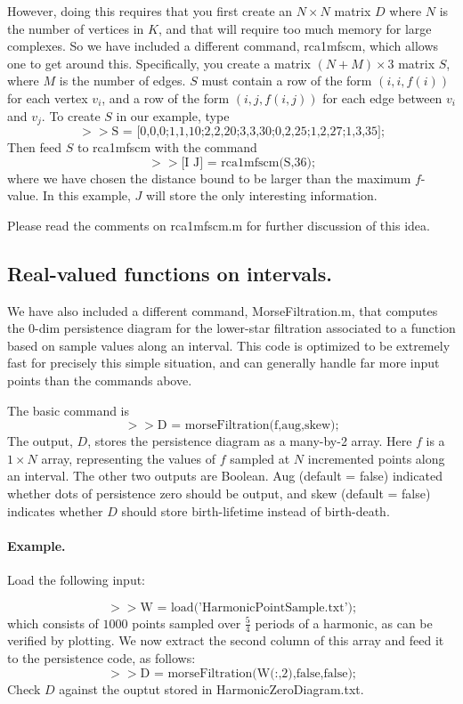 \documentclass[a4paper,10pt]{article}
\begin{document}
However, doing this requires that you first create an $N \times N$ matrix $D$ where $N$ is the number of vertices in $K$, and
that will require too much memory for large complexes.
So we have included a different command, rca1mfscm, which allows one to get around this.
Specifically, you create a matrix $(N + M) \times 3$ matrix $S$, where $M$ is the number of edges.
$S$ must contain a row of the form $(i,i,f(i))$ for each vertex $v_i$, and a row of the form
$(i,j, f(i,j))$ for each edge between $v_i$ and $v_j$.
To create $S$ in our example, type
$$ >> \mbox{S = [0,0,0;1,1,10;2,2,20;3,3,30;0,2,25;1,2,27;1,3,35];}$$
Then feed $S$ to rca1mfscm with the command
$$ >> \mbox{[I J] = rca1mfscm(S,36);}$$
where we have chosen the distance bound to be larger than the maximum $f$-value.
In this example, $J$ will store the only interesting information.

Please read the comments on rca1mfscm.m for further discussion of this idea.

\subsection{Real-valued functions on intervals.}

We have also included a different command, MorseFiltration.m, that computes the 0-dim persistence diagram for the lower-star filtration
associated to a function based on sample values along an interval.
This code is optimized to be extremely fast for precisely this simple situation, and can generally handle far more input points than the commands above.

The basic command is
$$ >> \mbox{D = morseFiltration(f,aug,skew);}$$
The output, $D$, stores the persistence diagram as a many-by-2 array.
Here $f$ is a $1 \times N$ array, representing the values of $f$ sampled at $N$ incremented points along an interval.
The other two outputs are Boolean. Aug (default = false) indicated whether dots of persistence zero should be output,
and skew (default = false) indicates whether $D$ should store birth-lifetime instead of birth-death.

\paragraph{Example.}

Load the following input:

$$ >> \mbox{W = load('HarmonicPointSample.txt');}$$
which consists of $1000$ points sampled over $\frac54$ periods of a harmonic, as can be verified by plotting.
We now extract the second column of this array and feed it to the persistence code, as follows:
$$ >> \mbox{D = morseFiltration(W(:,2),false,false);}$$
Check $D$ against the ouptut stored in HarmonicZeroDiagram.txt.
\end{document}
